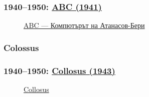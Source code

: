 \documentclass[ignorenonframetext, hyperref=unicode]{beamer}
\begin{document}
\begin{frame}
\frametitle{1940--1950: 
\href{http://en.wikipedia.org/wiki/Atanasoff-Berry_Computer}{ABC (1941)}} 
\begin{figure}[h]
\center
{}
\caption{\href{http://en.wikipedia.org/wiki/Atanasoff-Berry_Computer}{ABC
--- Компютърът на Атанасов-Бери}}
\end{figure}
\end{frame}



\subsubsection{Colossus}

\begin{frame}
\frametitle{1940--1950: 
\href{http://en.wikipedia.org/wiki/Colossus_computer}{Collosus (1943)}}
\begin{figure}[h]
\center
{}
\caption{\href{http://en.wikipedia.org/wiki/Image:Colossus.jpg}{Collosus}}
\end{figure}
\end{frame}
\end{document}
